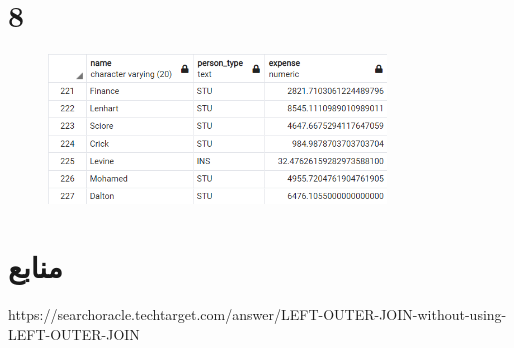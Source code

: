 \documentclass{article}
\begin{document}
\section{8}
\begin{figure}[H]
    \centering
    \includegraphics[width=0.8\textwidth]{figures/8.png}
    \caption
	{
	}
    \label{fig:fig1}
\end{figure}


\section*{منابع}
\renewcommand{\section}[2]{}%
\begin{thebibliography}{99} %


\begin{LTRitems}

\resetlatinfont

 https://searchoracle.techtarget.com/answer/LEFT-OUTER-JOIN-without-using-LEFT-OUTER-JOIN
\end{LTRitems}

\end{thebibliography}
\end{document}
